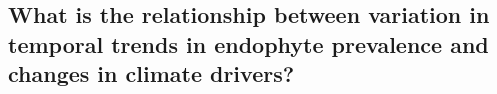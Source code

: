 \documentclass[11pt]{article}
\begin{document}






\subsection*{What is the relationship between variation in temporal trends in endophyte prevalence and changes in climate drivers?}
\end{document}
